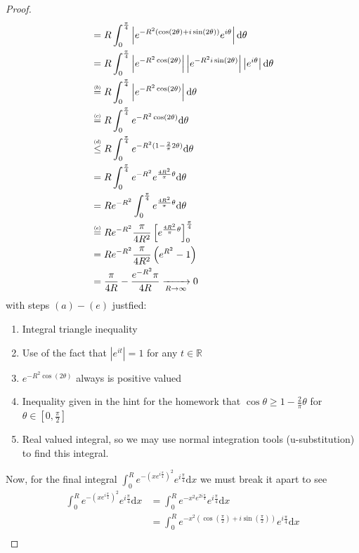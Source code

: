 \documentclass{article}
\newcommand\numeq[1]%
  {\stackrel{\scriptscriptstyle(\mkern-1.5mu#1\mkern-1.5mu)}{=}}
\newcommand\numleq[1]
  {\stackrel{\scriptscriptstyle(\mkern-1.5mu#1\mkern-1.5mu)}{\leq}}
\begin{document}
\begin{proof}
\begin{align*}
    &=R\int_0^{\frac{\pi}{4}} \left|e^{-R^2(\cos(2 \theta) + i \sin(2 \theta))}e^{i\theta} \right| \mathrm{d}\theta \\
    &= R\int_0^{\frac{\pi}{4}}\left|e^{-R^2\cos(2 \theta)}\right| \left|e^{-R^2i\sin(2 \theta)} \right|\left|e^{i \theta} \right| \mathrm{d} \theta \\
    &\numeq{b} R \int_0^{\frac{\pi}{4}} \left|e^{-R^2 \cos(2 \theta)} \right| \mathrm{d}\theta \\
    &\numeq{c} R \int_0^{\frac{\pi}{4}} e^{-R^2 \cos(2 \theta)} \mathrm{d}\theta \\
    &\numleq{d} R \int_0^{\frac{\pi}{4}}e^{-R^2(1 - \frac{2}{\pi}2 \theta)} \mathrm{d} \theta \\
    &= R \int_0^{\frac{\pi}{4}}e^{-R^2}e^{\frac{4 R^2}{\pi}\theta}\mathrm{d} \theta \\
    &= Re^{-R^2 }\int_0^{\frac{\pi}{4}}e^{\frac{4 R^2}{\pi}\theta}\mathrm{d} \theta \\
    &\numeq{e} Re^{-R^2} \frac{\pi}{4R^2}\left[ e^{\frac{4R^2}{\pi}\theta} \right]_0^{\frac{\pi}{4}}\\
    &= Re^{-R^2}\frac{\pi}{4R^2} \left(e^{R^2} - 1\right) \\
    &= \frac{\pi}{4R} - \frac{e^{-R^2}\pi}{4R } \xrightarrow[R \to \infty]{} 0
  \end{align*}
with steps $(a) - (e)$ justfied:
\begin{enumerate}[\indent(a)]
 \item Integral triangle inequality 
 \item Use of the fact that $\left|e^{it}\right| = 1$ for any $t \in \mathbb{R}$
 \item $e^{-R^2\cos(2 \theta)}$ always is positive valued
 \item Inequality given in the hint for the homework that $\cos \theta \geq 1 - \frac{2}{\pi}\theta$ for $\theta \in \left[0, \frac{\pi}{2} \right]$
 \item Real valued integral, so we may use normal integration tools (u-substitution) to find this integral.  
\end{enumerate}
Now, for the final integral $\int_0^Re^{-\left(xe^{i \frac{\pi}{4}}\right)^2}e^{i \frac{\pi}{4}} \mathrm{d}x$ we must break it apart to see 
\begin{align*}
  \int_0^Re^{-\left(xe^{i \frac{\pi}{4}}\right)^2}e^{i \frac{\pi}{4}} \mathrm{d}x &= \int_0^R e^{-x^2e^{2i \frac{\pi}{4}}} e^{i \frac{\pi}{4}} \mathrm{d}x \\
  &= \int_0^R e^{-x^2\left(\cos\left(\frac{\pi}{2}\right)+ i\sin \left(\frac{\pi}{2}\right)\right)}e^{i\frac{\pi}{4}} \mathrm{d}x \\

\end{align*}
\end{proof}
\end{document}
